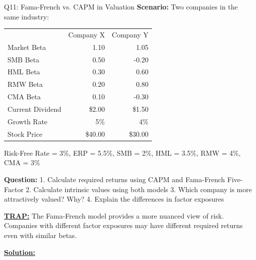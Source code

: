 \documentclass{beamer}
\renewcommand{\scriptsize}{\fontsize{6pt}{7pt}\selectfont}
\begin{document}
	\begin{frame}{Q11: Fama-French vs. CAPM in Valuation}
		\scriptsize
		\textbf{Scenario:} Two companies in the same industry:
		
		\begin{tabular}{lrr}
			& Company X & Company Y \\
			Market Beta & 1.10 & 1.05 \\
			SMB Beta & 0.50 & -0.20 \\
			HML Beta & 0.30 & 0.60 \\
			RMW Beta & 0.20 & 0.80 \\
			CMA Beta & 0.10 & -0.30 \\
			Current Dividend & \$2.00 & \$1.50 \\
			Growth Rate & 5\% & 4\% \\
			Stock Price & \$40.00 & \$30.00 \\
		\end{tabular}
		
		Risk-Free Rate = 3\%, ERP = 5.5\%, SMB = 2\%, HML = 3.5\%, RMW = 4\%, CMA = 3\%
		
		\textbf{Question:}
		1. Calculate required returns using CAPM and Fama-French Five-Factor
		2. Calculate intrinsic values using both models
		3. Which company is more attractively valued? Why?
		4. Explain the differences in factor exposures
		
		\vspace{2pt}
		\underline{\textbf{TRAP:}} The Fama-French model provides a more nuanced view of risk. Companies with different factor exposures may have different required returns even with similar betas.
		
		\vspace{4pt}
		\underline{\textbf{Solution:}}
	\end{frame}
	
\end{document}
